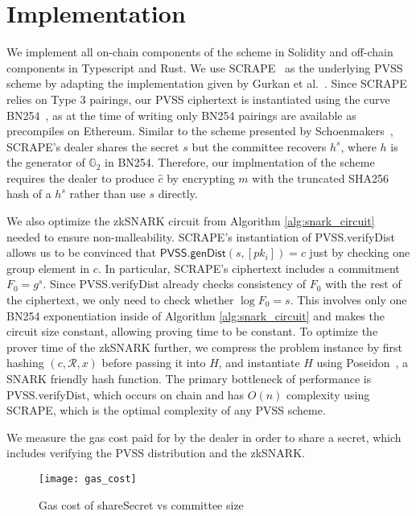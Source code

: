 \section{Implementation}

We implement all on-chain components of the scheme in Solidity and off-chain components in Typescript and Rust.
We use SCRAPE~\cite{pvss_scrape} as the underlying PVSS scheme by adapting the implementation given by Gurkan et al.~\cite{aggregatable_dkg}.
Since SCRAPE relies on Type 3 pairings, our PVSS ciphertext is instantiated using the curve BN254~\cite{bn254}, as at the time of writing only BN254 pairings are available as precompiles on Ethereum.
Similar to the scheme presented by Schoenmakers~\cite{pvss_schoenmakers}, SCRAPE's dealer shares the secret $s$ but the committee recovers $h^s$, where $h$ is the generator of $\mathbb{G}_2$ in BN254.
Therefore, our implmentation of the scheme requires the dealer to produce $\hat{c}$ by encrypting $m$ with the truncated SHA256 hash of a $h^s$ rather than use $s$ directly.

We also optimize the zkSNARK circuit from Algorithm \ref{alg:snark_circuit} needed to ensure non-malleability.
SCRAPE's instantiation of \textsf{PVSS.verifyDist} allows us to be convinced that $\textsf{PVSS.genDist}(s, [pk_i]) = c$ just by checking one group element in $c$.
In particular, SCRAPE's ciphertext includes a commitment $F_0 = g^s$.
Since \textsf{PVSS.verifyDist} already checks consistency of $F_0$ with the rest of the ciphertext, we only need to check whether $\log F_0 = s$.
This involves only one BN254 exponentiation inside of Algorithm \ref{alg:snark_circuit} and makes the circuit size constant, allowing proving time to be constant.
To optimize the prover time of the zkSNARK further, we compress the problem instance by first hashing $(c, \mathcal{R}, x)$ before passing it into $H$, and instantiate $H$ using Poseidon~\cite{poseidon}, a SNARK friendly hash function.
The primary bottleneck of performance is \textsf{PVSS.verifyDist}, which occurs on chain and has $O(n)$ complexity using SCRAPE, which is the optimal complexity of any PVSS scheme.


We measure the gas cost paid for by the dealer in order to share a secret, which includes verifying the PVSS distribution and the zkSNARK.
\begin{figure}
\caption{Gas cost of \textsf{shareSecret} vs committee size}
\texttt{[image: gas\_cost]}
\end{figure}


